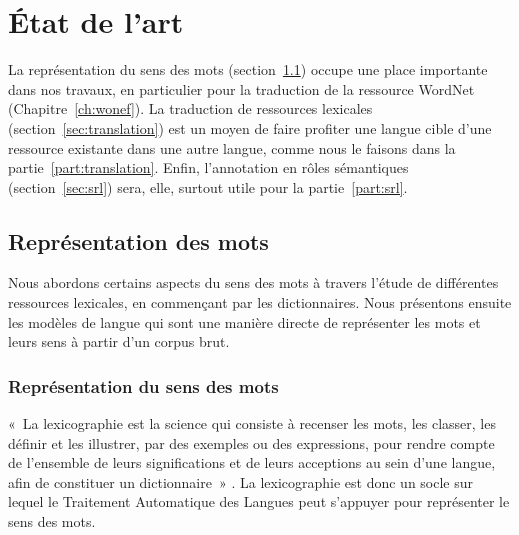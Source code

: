 

\chapter{État de l'art} 
\label{ch:etatdelart} 

La représentation du sens des mots (section~\ref{sec:mots}) occupe une place
importante dans nos travaux, en particulier pour la traduction de la ressource
WordNet (Chapitre~\ref{ch:wonef}). La traduction de ressources lexicales
(section~\ref{sec:translation}) est un moyen de faire profiter une langue cible
d'une ressource existante dans une autre langue, comme nous le faisons dans la
partie~\ref{part:translation}. Enfin, l'annotation en rôles sémantiques
(section~\ref{sec:srl}) sera, elle, surtout utile pour la
partie~\ref{part:srl}.

\section{Représentation des mots}
\label{sec:mots}

Nous abordons certains aspects du sens des mots à travers l'étude de
différentes ressources lexicales, en commençant par les dictionnaires. Nous
présentons ensuite les modèles de langue qui sont une manière directe de
représenter les mots et leurs sens à partir d'un corpus brut.

\subsection{Représentation du sens des mots}
\label{subsec:sens_mots}

«~La lexicographie est la science qui consiste à recenser les mots, les
classer, les définir et les illustrer, par des exemples ou des expressions,
pour rendre compte de l'ensemble de leurs significations et de leurs acceptions
au sein d'une langue, afin de constituer un dictionnaire~»
\citep{wikipedia2014lexicographie}. La lexicographie est donc un socle sur
lequel le Traitement Automatique des Langues peut s'appuyer pour représenter le
sens des mots.

